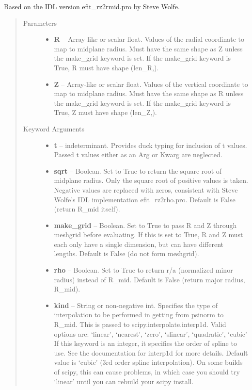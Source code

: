 \documentclass[letterpaper,10pt,english]{sphinxmanual}
\begin{document}
\begin{fulllineitems}
\begin{fulllineitems}
Based on the IDL version efit\_rz2rmid.pro by Steve Wolfe.
\begin{quote}\begin{description}
\item[{Parameters}] \leavevmode\begin{itemize}
\item {} 
\textbf{R} --
Array-like or scalar float.
Values of the radial coordinate to
map to midplane radius. Must have the same shape as Z unless
the make\_grid keyword is set. If the make\_grid keyword is True,
R must have shape (len\_R,).

\item {} 
\textbf{Z} --
Array-like or scalar float.
Values of the vertical coordinate to
map to midplane radius. Must have the same shape as R unless the
make\_grid keyword is set. If the make\_grid keyword is True, Z
must have shape (len\_Z,).

\end{itemize}

\item[{Keyword Arguments}] \leavevmode\begin{itemize}
\item {} 
\textbf{t} --
indeterminant.
Provides duck typing for inclusion of t values. Passed t values
either as an Arg or Kwarg are neglected.

\item {} 
\textbf{sqrt} --
Boolean.
Set to True to return the square root of midplane
radius. Only the square root of positive values is taken.
Negative values are replaced with zeros, consistent with Steve
Wolfe's IDL implementation efit\_rz2rho.pro. Default is False
(return R\_mid itself).

\item {} 
\textbf{make\_grid} --
Boolean.
Set to True to pass R and Z through meshgrid
before evaluating. If this is set to True, R and Z must each
only have a single dimension, but can have different lengths.
Default is False (do not form meshgrid).

\item {} 
\textbf{rho} --
Boolean.
Set to True to return r/a (normalized minor radius)
instead of R\_mid. Default is False (return major radius, R\_mid).

\item {} 
\textbf{kind} --
String or non-negative int.
Specifies the type of interpolation
to be performed in getting from psinorm to R\_mid. This is
passed to scipy.interpolate.interp1d. Valid options are:
`linear', `nearest', `zero', `slinear', `quadratic', `cubic'
If this keyword is an integer, it specifies the order of spline
to use. See the documentation for interp1d for more details.
Default value is `cubic' (3rd order spline interpolation). On
some builds of scipy, this can cause problems, in which case
you should try `linear' until you can rebuild your scipy install.


\end{itemize}
\end{description}
\end{quote}
\end{fulllineitems}
\end{fulllineitems}
\end{document}

